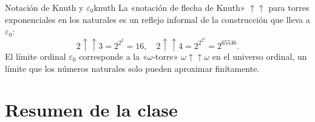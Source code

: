 \begin{ejemplo}{Notación de Knuth y $\varepsilon_0$}{knuth}
La «notación de flecha de Knuth» $\uparrow\uparrow$ para torres exponenciales en los naturales es un reflejo informal de la construcción que lleva a $\varepsilon_0$:
\[
  2 \uparrow\uparrow 3 = 2^{2^2} = 16,
  \quad
  2 \uparrow\uparrow 4 = 2^{2^{2^2}} = 2^{65536}.
\]
El límite ordinal $\varepsilon_0$ corresponde a la «$\omega$-torre» $\omega \uparrow\uparrow \omega$ en el universo ordinal, un límite que los números naturales solo pueden aproximar finítamente.
\end{ejemplo}

\section{Resumen de la clase}

